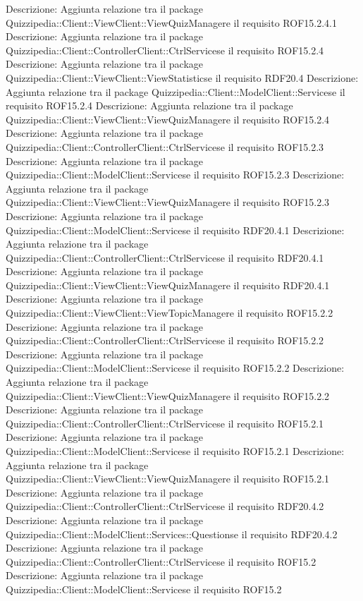 Descrizione: Aggiunta relazione tra il package Quizzipedia::Client::ViewClient::ViewQuizManagere il requisito ROF15.2.4.1 
Descrizione: Aggiunta relazione tra il package Quizzipedia::Client::ControllerClient::CtrlServicese il requisito ROF15.2.4 
Descrizione: Aggiunta relazione tra il package Quizzipedia::Client::ViewClient::ViewStatisticse il requisito RDF20.4 
Descrizione: Aggiunta relazione tra il package Quizzipedia::Client::ModelClient::Servicese il requisito ROF15.2.4 
Descrizione: Aggiunta relazione tra il package Quizzipedia::Client::ViewClient::ViewQuizManagere il requisito ROF15.2.4 
Descrizione: Aggiunta relazione tra il package Quizzipedia::Client::ControllerClient::CtrlServicese il requisito ROF15.2.3 
Descrizione: Aggiunta relazione tra il package Quizzipedia::Client::ModelClient::Servicese il requisito ROF15.2.3 
Descrizione: Aggiunta relazione tra il package Quizzipedia::Client::ViewClient::ViewQuizManagere il requisito ROF15.2.3 
Descrizione: Aggiunta relazione tra il package Quizzipedia::Client::ModelClient::Servicese il requisito RDF20.4.1 
Descrizione: Aggiunta relazione tra il package Quizzipedia::Client::ControllerClient::CtrlServicese il requisito RDF20.4.1 
Descrizione: Aggiunta relazione tra il package Quizzipedia::Client::ViewClient::ViewQuizManagere il requisito RDF20.4.1 
Descrizione: Aggiunta relazione tra il package Quizzipedia::Client::ViewClient::ViewTopicManagere il requisito ROF15.2.2 
Descrizione: Aggiunta relazione tra il package Quizzipedia::Client::ControllerClient::CtrlServicese il requisito ROF15.2.2 
Descrizione: Aggiunta relazione tra il package Quizzipedia::Client::ModelClient::Servicese il requisito ROF15.2.2 
Descrizione: Aggiunta relazione tra il package Quizzipedia::Client::ViewClient::ViewQuizManagere il requisito ROF15.2.2 
Descrizione: Aggiunta relazione tra il package Quizzipedia::Client::ControllerClient::CtrlServicese il requisito ROF15.2.1 
Descrizione: Aggiunta relazione tra il package Quizzipedia::Client::ModelClient::Servicese il requisito ROF15.2.1 
Descrizione: Aggiunta relazione tra il package Quizzipedia::Client::ViewClient::ViewQuizManagere il requisito ROF15.2.1 
Descrizione: Aggiunta relazione tra il package Quizzipedia::Client::ControllerClient::CtrlServicese il requisito RDF20.4.2 
Descrizione: Aggiunta relazione tra il package Quizzipedia::Client::ModelClient::Services::Questionse il requisito RDF20.4.2 
Descrizione: Aggiunta relazione tra il package Quizzipedia::Client::ControllerClient::CtrlServicese il requisito ROF15.2 
Descrizione: Aggiunta relazione tra il package Quizzipedia::Client::ModelClient::Servicese il requisito ROF15.2 
